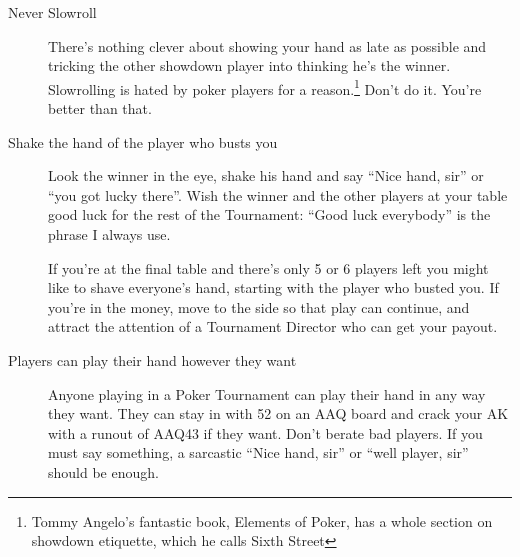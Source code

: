 \begin{description}

\item[Never Slowroll]  There's nothing clever about showing your hand
as late as possible and tricking the other showdown player into thinking
he's the winner. Slowrolling is hated by poker players for a 
reason.\footnote{Tommy Angelo's fantastic book, Elements of Poker, has
a whole section on showdown etiquette, which he calls Sixth Street}
Don't do it. You're better than that.

\item[Shake the hand of the player who busts you] Look the winner in the
eye, shake his hand and say ``Nice hand, sir'' or ``you got lucky there''.
Wish the winner and the other players at your table good luck for the
rest of the Tournament: ``Good luck everybody'' is the phrase I always use.

If you're at the final table and there's only 5 or 6 players left you
might like to shave everyone's hand, starting with the player who
busted you. If you're in the money, move to the side so that play
can continue, and attract the attention of a Tournament Director who
can get your payout.


\item[Players can play their hand however they want] Anyone playing in
a Poker Tournament can play their hand in any way they want. They
can stay in with 52 on an AAQ board and crack your AK with a runout
of AAQ43 if they want. Don't berate bad players. If you must say
something, a sarcastic ``Nice hand, sir'' or ``well player, sir'' should
be enough.

\end{description}
